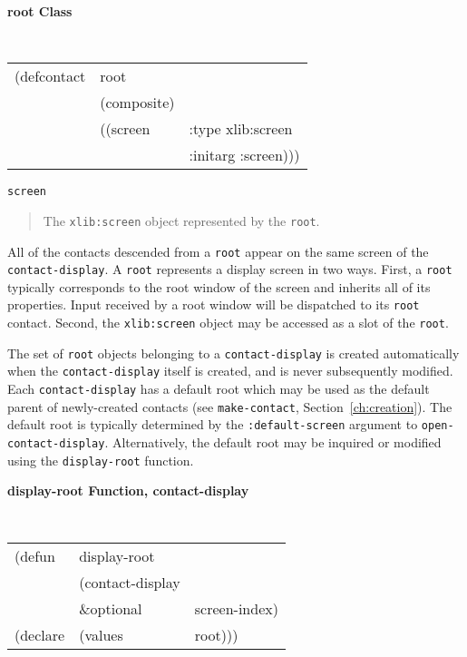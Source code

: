 {\samepage
{\large {\bf root \hfill Class}} 
\begin{flushright} \parbox[t]{6.125in}{
\tt
\begin{tabular}{lll}
\raggedright
(defcontact & root  & \\ 
& (composite) & \\
&((screen & :type xlib:screen\\ 
&          & :initarg :screen)))
\end{tabular}
\rm

}\end{flushright}}

\begin{flushright} \parbox[t]{6.125in}{
{\tt screen}
\begin{quote}
The {\tt xlib:screen} object represented by the {\tt root}.
\end{quote}

}\end{flushright}



All of the contacts descended from a {\tt root} appear on the same screen of
the {\tt contact-display}. A {\tt root} represents a display screen in
two ways. First, a {\tt root} typically corresponds to the root window of the
screen and inherits all of its properties\footnotemark{}.  
Input received by a root window
will be dispatched to its {\tt root} contact. Second, the  {\tt xlib:screen} object
may be accessed as a slot of the {\tt root}.

The set of {\tt root} objects belonging to a {\tt contact-display} is
created
automatically when the {\tt contact-display} itself is created, and is never
subsequently modified. Each {\tt contact-display} has a default root which may
be used as the default parent of newly-created contacts (see
{\tt make-contact}, Section~\ref{ch:creation}).
The default
root is typically determined by the {\tt :default-screen} argument to
{\tt open-contact-display}.
Alternatively, the default root may be inquired or modified using the
{\tt display-root} function.

{\samepage
{\large {\bf display-root \hfill Function, contact-display}}
\begin{flushright} \parbox[t]{6.125in}{
\tt
\begin{tabular}{lll}
\raggedright
(defun & display-root & \\ 
& (contact-display\\
& \&optional &  screen-index) \\
(declare &(values  & root)))
\end{tabular}
\rm

}\end{flushright}
}

